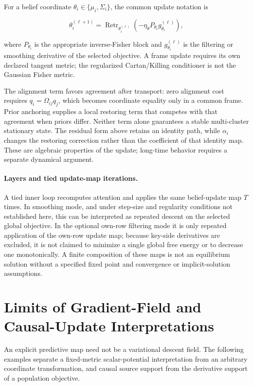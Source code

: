 \documentclass[twoside,11pt]{article}
\begin{document}
For a belief coordinate $\theta_i\in\{\mu_i,\Sigma_i\}$, the common update notation is

\begin{equation}
\theta_i^{(\ell+1)}
=\operatorname{Retr}_{\theta_i^{(\ell)}}
\left(-\eta_\theta P_{\theta_i}g_{\theta_i}^{(\ell)}\right),
\end{equation}

where $P_{\theta_i}$ is the appropriate inverse-Fisher block and $g_{\theta_i}^{(\ell)}$ is the filtering or smoothing derivative of the selected objective. A frame update requires its own declared tangent metric; the regularized Cartan/Killing conditioner is not the Gaussian Fisher metric.

The alignment term favors agreement after transport: zero alignment cost requires $q_i=\Omega_{ij}q_j$, which becomes coordinate equality only in a common frame. Prior anchoring supplies a local restoring term that competes with that agreement when priors differ. Neither term alone guarantees a stable multi-cluster stationary state. The residual form above retains an identity path, while $\alpha_i$ changes the restoring correction rather than the coefficient of that identity map. These are algebraic properties of the update; long-time behavior requires a separate dynamical argument.

\paragraph{Layers and tied update-map iterations.}
A tied inner loop recomputes attention and applies the same belief-update map $T$ times. In smoothing mode, and under step-size and regularity conditions not established here, this can be interpreted as repeated descent on the selected global objective. In the optional own-row filtering mode it is only repeated application of the own-row update map; because key-side derivatives are excluded, it is not claimed to minimize a single global free energy or to decrease one monotonically. A finite composition of these maps is not an equilibrium solution without a specified fixed point and convergence or implicit-solution assumptions.


\section{Limits of Gradient-Field and Causal-Update Interpretations}
\label{sec:gradient_scope_limits}

An explicit predictive map need not be a variational descent field. The following examples separate a fixed-metric scalar-potential interpretation from an arbitrary coordinate transformation, and causal source support from the derivative support of a population objective.
\end{document}
